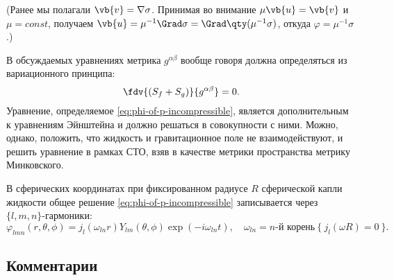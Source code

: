 \documentclass[\docroot/reports/draft/report.tex]{subfiles}
\begin{document}
    (Ранее мы полагали $\vb{v} = \nabla \sigma$. Принимая во внимание $\mu \vb{u} = \vb{v}$ и $\mu = const$, получаем $\vb{u} = \mu^{-1} \Grad \sigma = \Grad \qty(\mu^{-1} \sigma)$, откуда $\varphi = \mu^{-1} \sigma$.)

    В обсуждаемых уравнениях метрика $g^{\alpha\beta}$ вообще говоря должна определяться из вариационного принципа:
    \begin{equation*}
        \fdv{(S_f + S_g)}{g^{\alpha\beta}} = 0 .
    \end{equation*}
    Уравнение, определяемое \autoref{eq:phi-of-p-incompressible}, является дополнительным к уравнениям Эйнштейна и должно решаться в совокупности с ними. Можно, однако, положить, что жидкость и гравитационное поле не взаимодействуют, и решить уравнение в рамках СТО, взяв в качестве метрики пространства метрику Минковского.

    В сферических координатах при фиксированном радиусе $R$ сферической капли жидкости общее решение \autoref{eq:phi-of-p-incompressible} записывается через $\{l,m,n\}$-гармоники:
    \begin{equation*}
        \varphi_{lmn}(r,\theta,\phi) =
            j_l(\omega_{ln} r) Y_{lm}(\theta,\phi) \exp(-i \omega_{ln} t) , \quad
        \omega_{ln} = \text{$n$-й корень}\ \{\ j_l(\omega R) = 0\ \} .
    \end{equation*}

\subsection{Комментарии}
\end{document}
